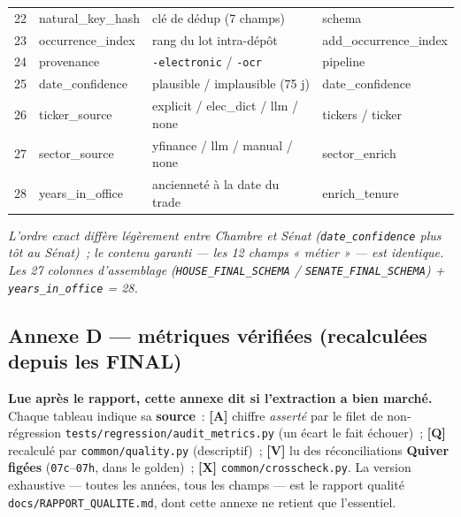 \documentclass[11pt,a4paper]{article}
\newcommand{\co}[1]{\texttt{\small #1}}
\begin{document}
{\begin{longtable}{r >{\ttfamily}p{3.3cm} p{8.2cm} >{\ttfamily\scriptsize}p{3.0cm}}
22 & natural_key_hash & clé de dédup (7 champs) & schema \\
23 & occurrence_index & rang du lot intra-dépôt & add_occurrence_index \\
24 & provenance & \co{*-electronic} / \co{*-ocr} & pipeline \\
25 & date_confidence & plausible / implausible (75 j) & date_confidence \\
26 & ticker_source & explicit / elec\_dict / llm / none & tickers / ticker \\
27 & sector_source & yfinance / llm / manual / none & sector_enrich \\
28 & years_in_office & ancienneté à la date du trade & enrich_tenure \\
\bottomrule
\end{longtable}}
\textit{L'ordre exact diffère légèrement entre Chambre et Sénat (\co{date_confidence} plus tôt au
Sénat)~; le contenu garanti — les 12 champs « métier » — est identique. Les 27 colonnes d'assemblage
(\co{HOUSE_FINAL_SCHEMA} / \co{SENATE_FINAL_SCHEMA}) + \co{years_in_office} = 28.}

\subsection{Annexe D — métriques vérifiées (recalculées depuis les FINAL)}
\label{anx:metrics}
\textbf{Lue après le rapport, cette annexe dit si l'extraction a bien marché.} Chaque tableau indique sa
\textbf{source}~: \textbf{[A]} chiffre \emph{asserté} par le filet de non-régression
\co{tests/regression/audit_metrics.py} (un écart le fait échouer)~; \textbf{[Q]} recalculé par
\co{common/quality.py} (descriptif)~; \textbf{[V]} lu des réconciliations \textbf{Quiver figées}
(\co{07c}--\co{07h}, dans le golden)~; \textbf{[X]} \co{common/crosscheck.py}. La version exhaustive — toutes
les années, tous les champs — est le rapport qualité \co{docs/RAPPORT_QUALITE.md}, dont cette annexe ne
retient que l'essentiel.
\end{document}
